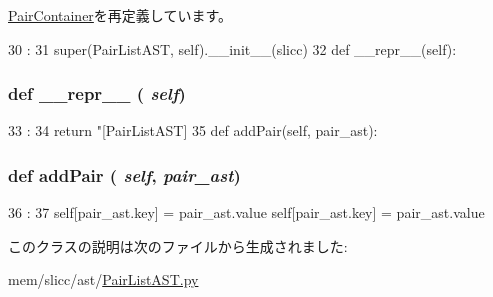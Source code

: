 \hyperlink{classslicc_1_1util_1_1PairContainer_ac775ee34451fdfa742b318538164070e}{PairContainer}を再定義しています。


\begin{DoxyCode}
30                              :
31         super(PairListAST, self).__init__(slicc)
32 
    def __repr__(self):
\end{DoxyCode}
\hypertarget{classslicc_1_1ast_1_1PairListAST_1_1PairListAST_ad8b9328939df072e4740cd9a63189744}{
\subsubsection[{\_\-\_\-repr\_\-\_\-}]{\setlength{\rightskip}{0pt plus 5cm}def \_\-\_\-repr\_\-\_\- ( {\em self})}}
\label{classslicc_1_1ast_1_1PairListAST_1_1PairListAST_ad8b9328939df072e4740cd9a63189744}



\begin{DoxyCode}
33                       :
34         return "[PairListAST] %
35 
    def addPair(self, pair_ast):
\end{DoxyCode}
\hypertarget{classslicc_1_1ast_1_1PairListAST_1_1PairListAST_a94e451632bd634a87d2a5ba5a4658b76}{
\subsubsection[{addPair}]{\setlength{\rightskip}{0pt plus 5cm}def addPair ( {\em self}, \/   {\em pair\_\-ast})}}
\label{classslicc_1_1ast_1_1PairListAST_1_1PairListAST_a94e451632bd634a87d2a5ba5a4658b76}



\begin{DoxyCode}
36                                :
37         self[pair_ast.key] = pair_ast.value
        self[pair_ast.key] = pair_ast.value
\end{DoxyCode}


このクラスの説明は次のファイルから生成されました:\begin{DoxyCompactItemize}
\item 
mem/slicc/ast/\hyperlink{PairListAST_8py}{PairListAST.py}\end{DoxyCompactItemize}

